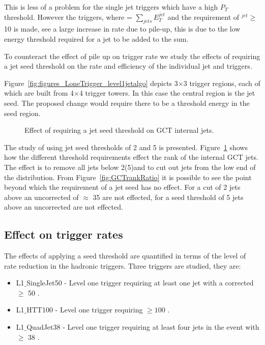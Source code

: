 This is less of a problem for the single jet triggers which have a high $P_{T}$ 
threshold. However the \HT triggers, where \HT = $\sum_{jets}E_{T}^{jet}$ and 
the requirement of \ET$^{jet} \geq $10 \GeV is made, see a large increase in 
rate due to pile-up, this is due to the low energy  threshold required for a 
jet to be added to the \HT sum.

To counteract the effect of pile up on trigger rate we study the effects of 
requiring a jet seed threshold on the rate and efficiency of the individual jet 
and \HT triggers.

Figure~\ref{fig:figures_LoneTrigger_level1jetalgo} depicts 3$\times$3 trigger
regions, each of which are built from 4$\times$4 trigger towers. In this case 
the central region is the jet seed. The proposed change would require there to 
be a threshold energy in the seed region.





\begin{figure}[h!]
    \centering
    \caption{Effect of requiring a jet seed threshold on GCT internal jets.}
    \label{fig:GCTrank}
\end{figure}

The study of using jet seed thresholds of 2 and 5 \GeV is presented.
Figure~\ref{fig:GCTrank} shows how the different threshold requirements effect 
the rank of the internal GCT jets. The effect is to remove all jets below 
2(5)\GeV and to cut out jets from the low end of the distribution. From 
Figure~\ref{fig:GCTrankRatio} it is possible to see the point beyond which the 
requirement of a jet seed has no effect. For a cut of 2 \GeV jets above an 
uncorrected \ET of $\approx$ 35 \GeV are not effected, for a seed threshold of 
5 \GeV jets above an uncorrected  \GeV are not effected.


\subsection{Effect on trigger rates} %
\label{sec:Effects on Rate}
The effects of applying a seed threshold are quantified in terms of the level of rate
reduction in the \Lone hadronic triggers.
Three triggers are studied, they are:
\begin{itemize}
  \item L1$\_$SingleJet50 - Level one trigger requiring at least one jet with a 
  corrected \ET $\geq$ 50 \GeV.
  \item L1$\_$HTT100 - Level one trigger requiring \HT $\geq 100$ \GeV.
  \item L1$\_$QuadJet38 - Level one trigger requiring at least four jets in the 
  event with \ET $\geq$ 38 \GeV.
\end{itemize}
